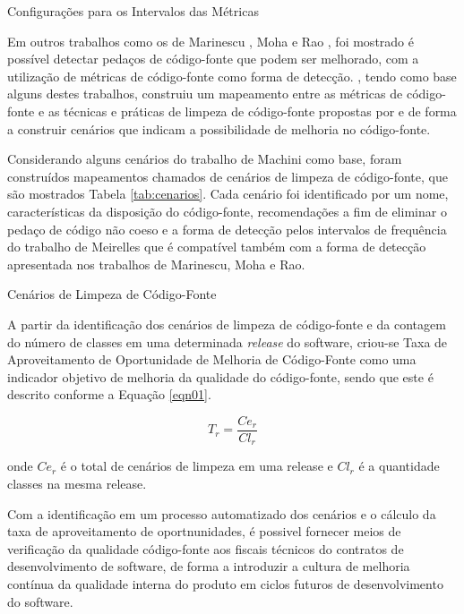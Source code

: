 	\begin{table}[!ht]
	\caption{Configurações para os Intervalos das Métricas}
	\addtolength{\belowcaptionskip}{2pt}
	\begin{center}
		
	\label{tab:good-metrics}
	\end{center}
	\end{table}
Em outros trabalhos como os de Marinescu  \cite{marinescu2005measurement}, Moha \cite{moha2010decor} e Rao \cite{rao2007detecting}, foi mostrado é possível detectar pedaços de código-fonte que podem ser melhorado\cite{fowler1999refactoring}, com a utilização de métricas de código-fonte como forma de detecção. \cite{Machini2010}, tendo como base alguns destes trabalhos, construiu um mapeamento entre as métricas de código-fonte e as técnicas e práticas de limpeza de código-fonte propostas por \cite{Martin2008} e \cite{beck2007implementation} de forma a construir cenários que indicam a possibilidade de melhoria no código-fonte.

Considerando alguns cenários do trabalho de Machini \cite{Machini2010} como base, foram construídos mapeamentos chamados de cenários de limpeza de código-fonte, que são mostrados Tabela \ref{tab:cenarios}. Cada cenário foi identificado por um nome, características da disposição do código-fonte, recomendações a fim de eliminar o pedaço de código não coeso e a forma de detecção pelos intervalos de frequência do trabalho de Meirelles \cite{Meirelles2013} que é compatível também com a forma de detecção apresentada nos trabalhos de Marinescu, Moha e Rao.
	
	\begin{table}[ht]
	\centering
	\caption{Cenários de Limpeza de Código-Fonte}
	\addtolength{\belowcaptionskip}{6pt}
		
	\label{tab:cenarios}
	\end{table}


A partir da identificação dos cenários de limpeza de código-fonte e da contagem do número de classes em uma determinada \textit{release} do software, criou-se Taxa de Aproveitamento de Oportunidade de Melhoria de Código-Fonte como uma indicador objetivo de melhoria da qualidade do código-fonte, sendo que este é descrito conforme a Equação \ref{eqn01}.

\begin{equation}
\label{eqn01}
T_r =   \frac{{{Ce_r}}}{{Cl_r}}
\end{equation}

onde $ Ce_r $ é o total de cenários de limpeza em uma release e $ Cl_r $ é a quantidade classes na mesma release.

Com a identificação em um processo automatizado dos cenários e o cálculo da taxa de aproveitamento de oportnunidades, é possivel fornecer meios de verificação da qualidade código-fonte aos fiscais técnicos do contratos de desenvolvimento de software, de forma a introduzir a cultura de melhoria contínua da qualidade interna do produto em ciclos futuros de desenvolvimento do software. 


